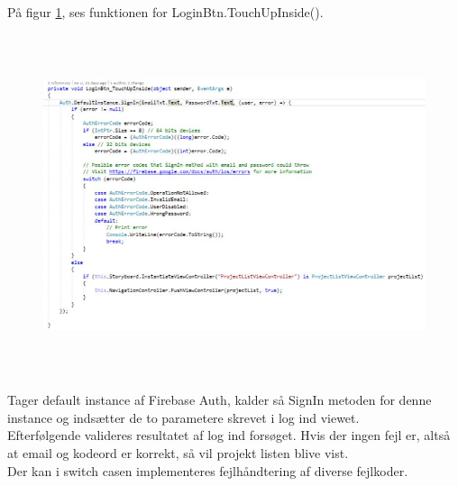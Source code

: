 På figur \ref{fig:LoginBtn}, ses funktionen for LoginBtn.TouchUpInside().
\begin{figure}[H] %
	\centering
	\includegraphics[height=10cm, width=18cm]{../ArkitekturDesign/Design/Login/LoginBtn}
	\caption{}
	\label{fig:LoginBtn}
\end{figure}
Tager default instance af Firebase Auth, kalder så SignIn metoden for denne instance og indsætter de to parametere skrevet i log ind viewet. \\
Efterfølgende valideres resultatet af log ind forsøget. Hvis der ingen fejl er, altså at email og kodeord er korrekt, så vil projekt listen blive vist. \\
Der kan i switch casen implementeres fejlhåndtering af diverse fejlkoder. 


\clearpage